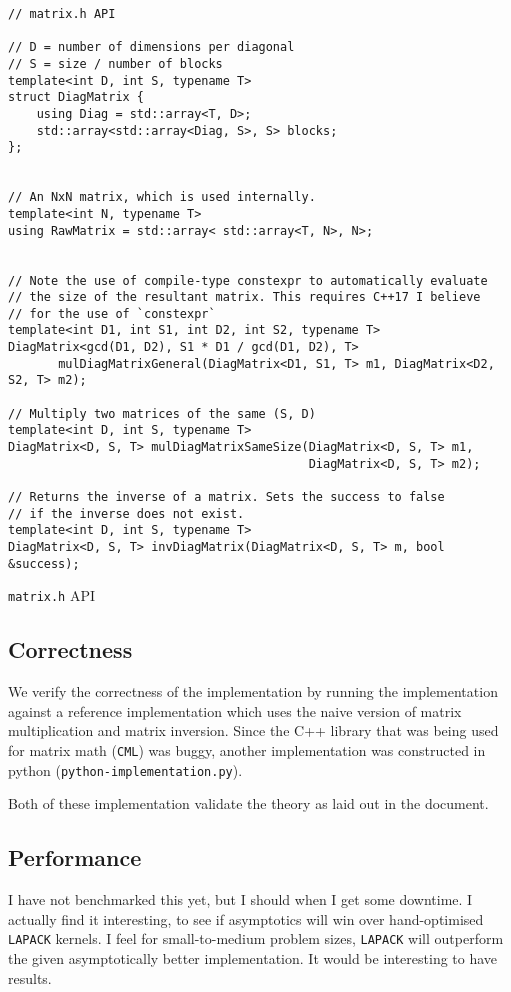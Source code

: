 \documentclass[11pt]{article}
\begin{document}
\begin{listing}
\begin{verbatim}
// matrix.h API

// D = number of dimensions per diagonal
// S = size / number of blocks
template<int D, int S, typename T>
struct DiagMatrix {
    using Diag = std::array<T, D>;
    std::array<std::array<Diag, S>, S> blocks;
};


// An NxN matrix, which is used internally.
template<int N, typename T>
using RawMatrix = std::array< std::array<T, N>, N>;


// Note the use of compile-type constexpr to automatically evaluate
// the size of the resultant matrix. This requires C++17 I believe
// for the use of `constexpr`
template<int D1, int S1, int D2, int S2, typename T>
DiagMatrix<gcd(D1, D2), S1 * D1 / gcd(D1, D2), T> 
       mulDiagMatrixGeneral(DiagMatrix<D1, S1, T> m1, DiagMatrix<D2, S2, T> m2);

// Multiply two matrices of the same (S, D)
template<int D, int S, typename T>
DiagMatrix<D, S, T> mulDiagMatrixSameSize(DiagMatrix<D, S, T> m1, 
                                          DiagMatrix<D, S, T> m2);

// Returns the inverse of a matrix. Sets the success to false
// if the inverse does not exist.
template<int D, int S, typename T>
DiagMatrix<D, S, T> invDiagMatrix(DiagMatrix<D, S, T> m, bool &success);
\end{verbatim}
\caption{\texttt{matrix.h} API}
\label{matrixhapi}
\end{listing}
\subsection{Correctness}
We verify the correctness of the implementation by running the implementation
against a reference implementation which uses the naive version of matrix
multiplication and matrix inversion. Since the C++ library that was being used
for matrix math ({\texttt{CML}}) was buggy, another implementation
was constructed in python (\texttt{python-implementation.py}). 

Both of these implementation validate the theory as laid out in the document.

\subsection{Performance}
I have not benchmarked this yet, but I should when I get some downtime. I 
actually find it interesting, to see if asymptotics will win over hand-optimised
\texttt{LAPACK} kernels. I feel for small-to-medium problem sizes,
\texttt{LAPACK} will outperform the given asymptotically better implementation.
It would be interesting to have results.
\end{document}
